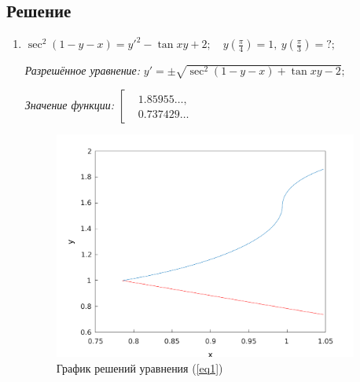 \documentclass[14pt, a4paper, titlepage, fleqn]{extarticle}
\begin{document}
        
        \subsection{Решение}
            \begin{enumerate}
                \item \( \sec^2{(1 -y- x)} = y'^2 - \tan{xy} + 2; \quad y \left( \frac{\pi}{4} \right) = 1, ~ y \left( \frac{\pi}{3} \right) = ?;  \)
                    \label{eq1}

                    \textit{Разрешённое уравнение:}
                        \( y' = \pm \sqrt{\sec^2 \left( 1 - y - x \right) + \tan{xy} - 2}; \)

                    \textit{Значение функции:}
                        \( \left[
                            \begin{aligned}
                                &1.85955\dots, \\
                                &0.737429\dots
                            \end{aligned}
                        \right. \)

                    \begin{figure}[H]
                        \centering
                        \includegraphics[width=10cm]{pictures/graph2_1.pdf}
                        \caption{График решений уравнения (\ref{eq1})}
                    \end{figure}

                    \pagebreak
                    

                \pagebreak
                


\end{enumerate}
\end{document}
